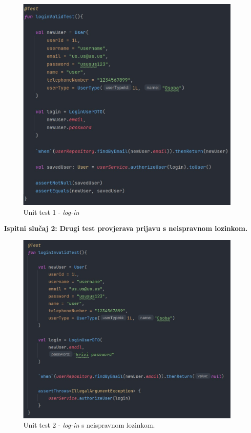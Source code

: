 		\begin{figure}[H]
			\includegraphics[scale=0.5]{slike/unit1.PNG} 
			\centering
			\caption{Unit test 1 - \textit{log-in}}
			\label{unit1}
		\end{figure}

\pagebreak
\textbf{Ispitni slučaj 2: Drugi test provjerava prijavu s neispravnom lozinkom.}

		\begin{figure}[H]
			\includegraphics[scale=0.5]{slike/unit2.PNG} 
			\centering
			\caption{Unit test 2 - \textit{log-in} s neispravnom lozinkom.}
			\label{unit2}
		\end{figure}

